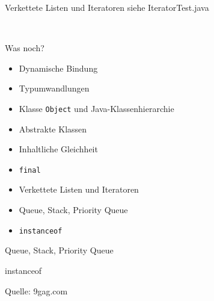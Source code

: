 \documentclass[18pt]{beamer}
\begin{document}
\begin{frame}{Verkettete Listen und Iteratoren}
 siehe IteratorTest.java
\end{frame}

\

\begin{frame}[fragile]{Was noch?}
\begin{itemize}
 \item Dynamische Bindung \checkmark
 \item Typumwandlungen \checkmark
 \item Klasse \verb|Object| und Java-Klassenhierarchie \checkmark
 \item Abstrakte Klassen \checkmark
 \item Inhaltliche Gleichheit \checkmark
 \item \verb|final| \checkmark
 \item Verkettete Listen und Iteratoren \checkmark
 \item Queue, Stack, Priority Queue
 \item \verb|instanceof|
\end{itemize}
\end{frame}

\begin{frame}{Queue, Stack, Priority Queue}
 
\end{frame}

\begin{frame}{instanceof}
 
\end{frame}


\begin{frame}
 
 \tiny{Quelle: 9gag.com}
\end{frame}
\end{document}
